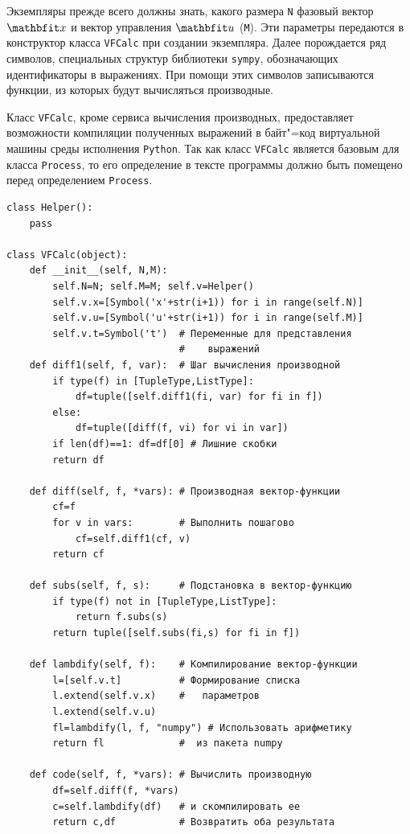 \documentclass[a4paper,14pt, openany, twoside, draft]{extbook} %
\begin{document}
Экземпляры прежде всего должны знать, какого размера \texttt{N} фазовый вектор $\vecx$ и вектор управления $\vecu$ (\texttt{M}).  Эти параметры передаются в конструктор класса \texttt{VFCalc} при создании экземпляра.  Далее порождается ряд символов, специальных структур библиотеки \texttt{sympy}, обозначающих идентификаторы в выражениях.  При помощи этих символов записываются функции, из которых будут вычисляться производные.

Класс \texttt{VFCalc}, кроме сервиса вычисления производных, предоставляет возможности компиляции полученных выражений в байт"=код виртуальной машины среды исполнения \texttt{Python}.  Так как класс \texttt{VFCalc} является базовым для класса \texttt{Process}, то его определение в тексте программы должно быть помещено перед определением \texttt{Process}.

\begin{verbatim}
class Helper():
    pass

class VFCalc(object):
    def __init__(self, N,M):
        self.N=N; self.M=M; self.v=Helper()
        self.v.x=[Symbol('x'+str(i+1)) for i in range(self.N)]
        self.v.u=[Symbol('u'+str(i+1)) for i in range(self.M)]
        self.v.t=Symbol('t')  # Переменные для представления
                              #    выражений
    def diff1(self, f, var):  # Шаг вычисления производной
        if type(f) in [TupleType,ListType]:
            df=tuple([self.diff1(fi, var) for fi in f])
        else:
            df=tuple([diff(f, vi) for vi in var])
        if len(df)==1: df=df[0] # Лишние скобки
        return df

    def diff(self, f, *vars): # Производная вектор-функции
        cf=f
        for v in vars:        # Выполнить пошагово
            cf=self.diff1(cf, v)
        return cf

    def subs(self, f, s):     # Подстановка в вектор-функцию
        if type(f) not in [TupleType,ListType]:
            return f.subs(s)
        return tuple([self.subs(fi,s) for fi in f])

    def lambdify(self, f):    # Компилирование вектор-функции
        l=[self.v.t]          # Формирование списка
        l.extend(self.v.x)    #   параметров
        l.extend(self.v.u)
        fl=lambdify(l, f, "numpy") # Использовать арифметику
        return fl             #  из пакета numpy

    def code(self, f, *vars): # Вычислить производную
        df=self.diff(f, *vars)
        c=self.lambdify(df)   # и скомпилировать ее
        return c,df           # Возвратить оба результата
\end{verbatim}
\end{document}
